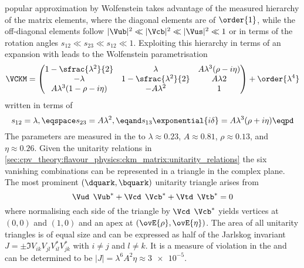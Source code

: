 popular approximation by Wolfenstein \cite{Wolfenstein:1983yz} takes advantage
of the measured hierarchy of the matrix elements, where the diagonal elements
are of $\order{1}$, while the off-diagonal elements follow $\vert\Vub\vert^2 \ll
\vert\Vcb\vert^2 \ll \vert\Vus\vert^2 \ll 1$ or in terms of the rotation angles
$s_{12} \ll s_{23} \ll s_{12} \ll 1$. Exploiting this hierarchy in terms of an
expansion with leads to the Wolfenstein parametrisation
%
\begin{equation}  
  \VCKM = \begin{pmatrix}
    1 - \sfrac{\lambda^2}{2}        & \lambda                     & A \lambda^3 (\rho - i\eta)  \\
    -\lambda                        & 1 - \sfrac{\lambda^2}{2}    & A \lambda  2                \\
    A \lambda^3 (1 - \rho - i\eta)  & - A \lambda^2               & 1                           \\
  \end{pmatrix}
  + \order{\lambda^4}
\end{equation}
%
written in terms of
%
\begin{equation}
  s_{12} = \lambda, \eqspace s_{23} = A \lambda^2, \eqand s_{13}\exponential{i\delta} = A \lambda^3 (\rho + i \eta) \eqpd
\end{equation}
%
The parameters are measured in the \SM to $\lambda \approx 0.23$, $A \approx
0.81$, $\rho \approx 0.13$, and $\eta \approx 0.26$. Given the unitarity
relations in
\cref{sec:cpv_theory:flavour_physics:ckm_matrix:unitarity_relations} the six
vanishing combinations can be represented in a triangle in the complex plane.
The most prominent ${(\dquark,\bquark)}$ unitarity triangle arises from
%
\begin{equation}
  \Vud^{\phantom{\ast}}\Vub^{\ast} + \Vcd^{\phantom{\ast}}\Vcb^{\ast} + \Vtd^{\phantom{\ast}}\Vtb^{\ast} = 0 
\end{equation}
%
where normalising each side of the triangle by
$\Vcd^{\phantom{\ast}}\Vcb^{\ast}$ yields vertices at ${(0,0)}$ and ${(1,0)}$
and an apex at ${(\ovE{\rho},\ovE{\eta})}$. The area of all unitarity triangles
is of equal size and can be expressed as half of the Jarlskog invariant $J = \pm
\Im V_{ik}^{\phantom{\ast}} V_{jl}^{\phantom{\ast}} V_{il}^{\ast} V_{jk}^{\ast}$
with $i \neq j$ and $l \neq k$. It is a measure of \CP violation in the \SM and
can be determined to be $\vert J \vert = \lambda^6 A^2 \eta \approx \num{3e-5}$.

